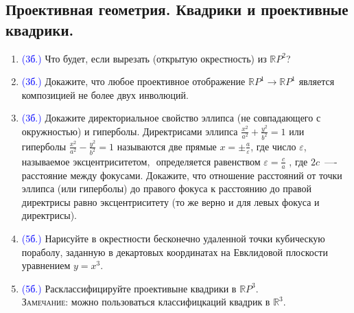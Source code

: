 \documentclass[11pt]{article}
\begin{document}
    \subsection*{Проективная геометрия. Квадрики и проективные квадрики.}
    \begin{enumerate}[start=1,label={\bfseries \arabic*.}]
        \item \textcolor{blue}{(3б.)} Что будет, если вырезать (открытую окрестность) из $\mathbb{R}P^2$?

        \item \textcolor{blue}{(3б.)} Докажите, что любое проективное отображение $\mathbb{R}P^1 \to \mathbb{R}P^1$ является композицией не более двух инволюций.

        \item \textcolor{blue}{(3б.)} Докажите директориальное свойство эллипса (не совпадающего с  окружностью) и гиперболы. Директрисами эллипса $\frac{x^2}{a^2} + \frac{y^2}{b^2} = 1$ или гиперболы  $\frac{x^2}{a^2} - \frac{y^2}{b^2} = 1$ называются две прямые $x = \pm\frac{a}{\varepsilon}$, где число $\varepsilon$, называемое эксцентриситетом,  определяется равенством $\varepsilon = \frac{c}{a}$ , где $2c$~—- расстояние между фокусами. Докажите, что отношение расстояний от точки эллипса (или гиперболы) до правого фокуса к расстоянию до правой директрисы равно эксцентриситету (то же верно и для левых фокуса и директрисы).

        \item \textcolor{blue}{(5б.)} Нарисуйте в окрестности бесконечно удаленной точки кубическую пораболу, заданную в декартовых координатах на Евклидовой плоскости
              уравнением $y = x^3$.

        \item \textcolor{blue}{(5б.)} Расклассифицируйте проективыне квадрики в $\mathbb{R}P^3$. \\
              \textsc{Замечание:} можно пользоваться классифицкаций квадрик в $\mathbb{R}^3$.
    \end{enumerate}
\end{document}
